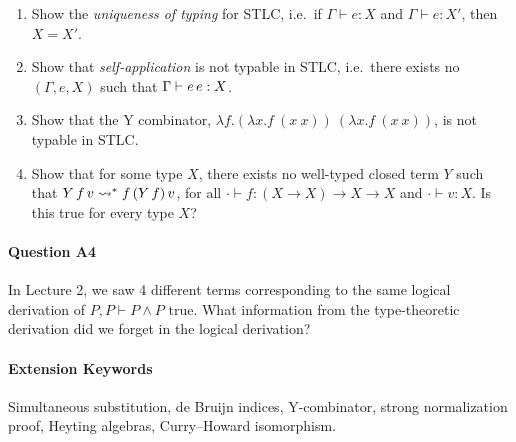 \documentclass[11pt,a4paper,twoside]{article}
\begin{document}
\begin{enumerate}[label=(\alph*)]
  \item Show the \emph{uniqueness of typing} for STLC, i.e.~if
    $\Gamma \vdash e : X$ and $\Gamma \vdash e : X'$,
    then $X = X'$.

  \item Show that \emph{self-application} is not typable in STLC,
    i.e.~there exists no $(\Gamma, e, X)$
    such that $\Gamma \vdash e \, e : X$.

  \item Show that the Y combinator, $\lambda f . (\lambda x .
    f\ (x\ x))\ (\lambda x . f\ (x\ x))$,
    is not typable in STLC.

  \item Show that for some type $X$, there exists no well-typed
    closed term $Y$ such that
    $Y \, f \, v \rightsquigarrow^* f \, (Y \, f) \, v$,
    for all $\cdot \vdash f : (X \to X) \to X \to X$ and $\cdot \vdash v : X$.
    Is this true for every type $X$?
\end{enumerate}

\paragraph{Question A4}
In Lecture 2, we saw 4 different terms corresponding to the same
logical derivation of $P, P \vdash P \wedge P \text{ true}$. What
information from the type-theoretic derivation did we forget in the
logical derivation?

\paragraph{Extension Keywords} Simultaneous substitution, de Bruijn
indices, Y-combinator, strong normalization proof, Heyting algebras,
Curry--Howard isomorphism.
\end{document}
